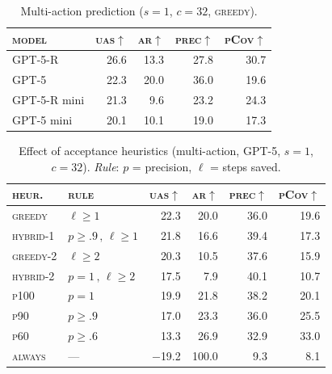 \documentclass{article}
\theoremstyle{plain}
\theoremstyle{definition}
\theoremstyle{remark}
\begin{document}
\begin{table}[t]
  \caption{Multi-action prediction ($s{=}1$, $c{=}32$, \textsc{greedy}).}
  \label{tab:models-multi}
  \centering
  \small
  \begin{tabular}{lrrrr}
    \toprule
    \textsc{model} & \textsc{uas}$\uparrow$ & \textsc{ar}$\uparrow$ & \textsc{prec}$\uparrow$ & \textsc{pCov}$\uparrow$ \\
    \midrule
    GPT-5-R  & 26.6 & 13.3 & 27.8 & 30.7 \\
    GPT-5       & 22.3 & 20.0 & 36.0 & 19.6 \\
    GPT-5-R mini       & 21.3 &  9.6 & 23.2 & 24.3 \\
    GPT-5 mini  & 20.1 & 10.1 & 19.0 & 17.3 \\
    \bottomrule
  \end{tabular}
\end{table}



\begin{table}[t]
  \caption{Effect of acceptance heuristics (multi-action, GPT-5, $s{=}1$, $c{=}32$). \textit{Rule}: $p$ = precision, $\ell$ = steps saved.}
  \label{tab:heuristics-results}
  \centering
  \small
  \setlength{\tabcolsep}{4pt}
  \begin{tabular}{@{}llrrrr@{}}
    \toprule
    \textsc{heur.} & \textsc{rule} & \textsc{uas}$\uparrow$ & \textsc{ar}$\uparrow$ & \textsc{prec}$\uparrow$ & \textsc{pCov}$\uparrow$ \\
    \midrule
    \textsc{greedy}   & $\ell{\geq}1$                & 22.3 & 20.0 & 36.0 & 19.6 \\
    \textsc{hybrid-1} & $p{\geq}.9\,,\,\ell{\geq}1$  & 21.8 & 16.6 & 39.4 & 17.3 \\
    \textsc{greedy-2} & $\ell{\geq}2$                & 20.3 & 10.5 & 37.6 & 15.9 \\
    \textsc{hybrid-2} & $p{=}1\,,\,\ell{\geq}2$      & 17.5 &  7.9 & 40.1 & 10.7 \\
    \textsc{p100}     & $p{=}1$                      & 19.9 & 21.8 & 38.2 & 20.1 \\
    \textsc{p90}      & $p{\geq}.9$                  & 17.0 & 23.3 & 36.0 & 25.5 \\
    \textsc{p60}      & $p{\geq}.6$                  & 13.3 & 26.9 & 32.9 & 33.0 \\
    \textsc{always}   & ---                          & $-$19.2 & 100.0 & 9.3 & 8.1 \\
    \bottomrule
  \end{tabular}
\end{table}
\end{document}

